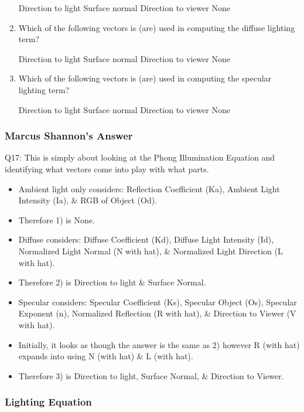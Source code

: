 \documentclass[11pt]{article}
\begin{document}
\begin{spacing}{1.2}
\begin{enumerate}[label=\arabic*)]
	Direction to light \qquad Surface normal \qquad Direction to viewer \qquad None
	\item Which of the following vectors is (are) used in computing the diffuse lighting term?
	
	Direction to light \qquad Surface normal \qquad Direction to viewer \qquad None
	\item Which of the following vectors is (are) used in computing the specular lighting term?
		
	Direction to light \qquad Surface normal \qquad Direction to viewer \qquad None

\end{enumerate}

\subsubsection{Marcus Shannon's Answer}

Q17: This is simply about looking at the Phong Illumination Equation and identifying what vectors come into play with what parts.
\begin{itemize}
    \item Ambient light only considers: Reflection Coefficient (Ka), Ambient Light Intensity (Ia), \& RGB of Object (Od).  
      \item Therefore 1) is None.
    \item Diffuse considers: Diffuse Coefficient (Kd), Diffuse Light Intensity (Id), Normalized Light Normal (N with hat), \& Normalized Light Direction (L with hat).
      \item Therefore 2) is Direction to light \& Surface Normal.
    \item Specular considers: Specular Coefficient (Ks), Specular Object (Os), Specular Exponent (n), Normalized Reflection (R with hat), \& Direction to Viewer (V with hat).
      \item Initially, it looks as though the answer is the same as 2) however R (with hat) expands into using N (with hat) \& L (with hat).
      \item Therefore 3) is Direction to light, Surface Normal, \& Direction to Viewer.
\end{itemize}

\subsubsection{Lighting Equation}


\end{spacing}
\end{document}
